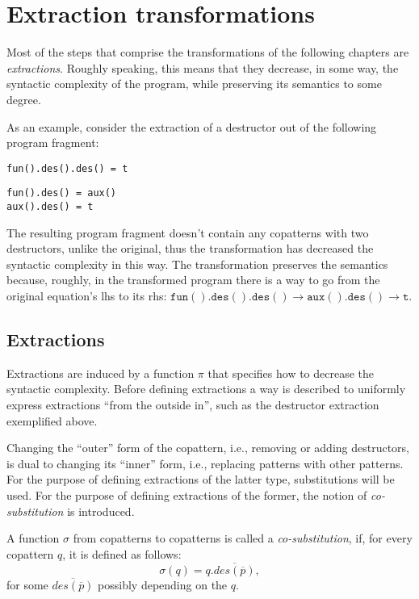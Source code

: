 \chapter{Extraction transformations}

Most of the steps that comprise the transformations of the following chapters are \textit{extractions}. Roughly speaking, this means that they decrease, in some way, the syntactic complexity of the program, while preserving its semantics to some degree.

As an example, consider the extraction of a destructor out of the following program fragment:
\begin{lstlisting}
fun().des().des() = t
\end{lstlisting}

\begin{lstlisting}
fun().des() = aux()
aux().des() = t
\end{lstlisting}
The resulting program fragment doesn't contain any copatterns with two destructors, unlike the original, thus the transformation has decreased the syntactic complexity in this way. The transformation preserves the semantics because, roughly, in the transformed program there is a way to go from the original equation's lhs to its rhs: $\mathtt{fun().des().des()} \longrightarrow \mathtt{aux().des()} \longrightarrow \mathtt{t}$.

\section{Extractions}
\label{sec:extrdef}

Extractions are induced by a function $\pi$ that specifies how to decrease the syntactic complexity. Before defining extractions a way is described to uniformly express extractions ``from the outside in'', such as the destructor extraction exemplified above.

Changing the ``outer'' form of the copattern, i.e., removing or adding destructors, is dual to changing its ``inner'' form, i.e., replacing patterns with other patterns. For the purpose of defining extractions of the latter type, substitutions will be used. For the purpose of defining extractions of the former, the notion of \textit{co-substitution} is introduced.

\begin{definition}[Co-substitution]
A function $\sigma$ from copatterns to copatterns is called a \textit{co-substitution}, if, for every copattern $q$, it is defined as follows:
\[
\sigma(q) = q.\overline{des(\overline{p})},
\]
for some $\overline{des(\overline{p})}$ possibly depending on the $q$.
\end{definition}

